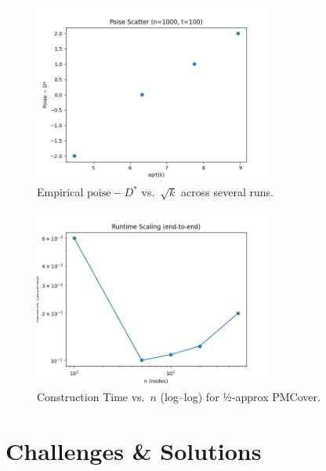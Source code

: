 \documentclass[11pt]{article}
\begin{document}
\begin{figure}[H]
  \centering
  \includegraphics[width=0.7\textwidth]{plots/poise_scatter.png}
  \caption{Empirical \(\text{poise}-D^*\) vs.\ \(\sqrt{k}\) across several runs.}
  \label{fig:poise}
\end{figure}

\begin{figure}[H]
  \centering
  \includegraphics[width=0.7\textwidth]{plots/runtime_scaling.png}
  \caption{Construction Time vs.\ \(n\) (log–log) for ½‐approx PMCover.}
  \label{fig:runtime}
\end{figure}
\section{Challenges \& Solutions}
\end{document}
